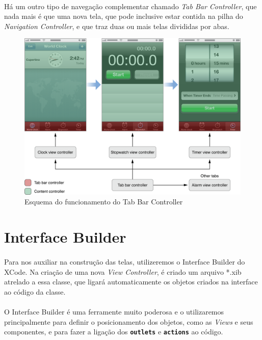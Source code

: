 \documentclass[a4paper,12pt,brazil,doubleside]{book}
\begin{document}
\paragraph{}Há um outro tipo de navegação complementar chamado \emph{Tab Bar Controller}, que nada mais é que uma nova tela, que pode inclusive estar contida na pilha do \emph{Navigation Controller}, e que traz duas ou mais telas divididas por abas.

\bigskip

\begin{figure}[h]
  \centering
  \includegraphics[totalheight=0.4\textheight]{../figuras/ios/apple_tabbar_interface.png}
  \caption{Esquema do funcionamento do Tab Bar Controller}
  \label{fig:a}
\end{figure}

\bigskip
\bigskip


\section{Interface Builder}

\paragraph{}Para nos auxiliar na construção das telas, utilizeremos o Interface Builder do XCode. Na criação de uma nova \emph{View Controller}, é criado um arquivo *.xib atrelado a essa classe, que ligará automaticamente os objetos criados na interface ao código da classe.
\paragraph{}O Interface Builder é uma ferramente muito poderosa e o utilizaremos principalmente para definir o posicionamento dos objetos, como as \emph{Views} e seus componentes, e para fazer a ligação dos \texttt{\textbf{outlets}} e \texttt{\textbf{actions}} ao código.
\end{document}
